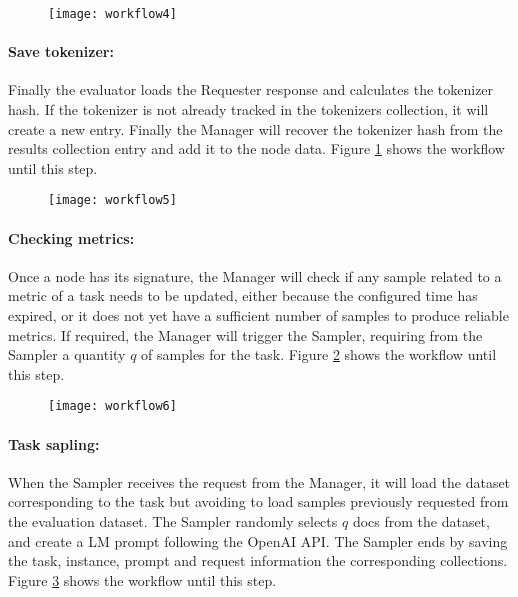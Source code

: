 \begin{figure}[htb!]
    \centering        
    \texttt{[image: workflow4]}
    \caption{}
    \label{secb:fig:wf4}
\end{figure}


\paragraph{Save tokenizer:}
Finally the evaluator loads the Requester response and calculates the tokenizer hash. If the tokenizer is not already tracked in the tokenizers collection, it will create a new entry. Finally the Manager will recover the tokenizer hash from the results collection entry and add it to the node data. Figure \ref{secb:fig:wf4} shows the workflow until this step.

\begin{figure}[htb!]
    \centering
    \texttt{[image: workflow5]}
    \caption{}
    \label{secb:fig:wf5}
\end{figure}


\paragraph{Checking metrics:}
Once a node has its signature, the Manager will check if any sample related to a metric of a task needs to be updated, either because the configured time has expired, or it does not yet have a sufficient number of samples to produce reliable metrics. 
If required, the Manager will trigger the Sampler, requiring from the Sampler a quantity $q$ of samples for the task. 
Figure \ref{secb:fig:wf5} shows the workflow until this step.


\begin{figure}[htb!]
    \centering
    \texttt{[image: workflow6]}
    \caption{}
    \label{secb:fig:wf6}
\end{figure}

\paragraph{Task sapling:}
When the Sampler receives the request from the Manager, it will load the dataset corresponding to the task but avoiding to load samples previously requested from the evaluation dataset. 
The Sampler randomly selects $q$ docs from the dataset, and create a \gls{LM} prompt following the OpenAI API. The Sampler ends by saving the task, instance, prompt and request information the corresponding collections.
Figure \ref{secb:fig:wf6} shows the workflow until this step.

